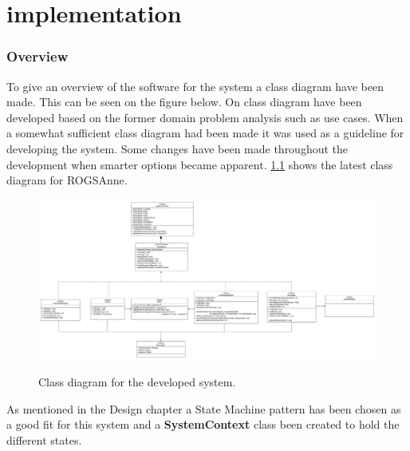 
\chapter{implementation}

\subsection{Overview}
To give an overview of the software for the system a class diagram have been made. This can be seen on the figure below.
On class diagram have been developed based on the former domain problem analysis such as use cases. When a somewhat sufficient class diagram had been made it was used as a guideline for developing the system. Some changes have been made throughout the development when smarter options became apparent. \cref{fig:ClassDiagram} shows the latest class diagram for ROGSAnne.

\begin{figure}[H]
	\centering
	{\includegraphics[width=\textwidth]{Images/ClassDiagram.PNG}}\\[0.5cm]
	\caption{Class diagram for the developed system.}
	\label{fig:ClassDiagram}
\end{figure}

As mentioned in the Design chapter a State Machine pattern has been chosen as a good fit for this system and a \textbf{SystemContext} class been created to hold the different states. 